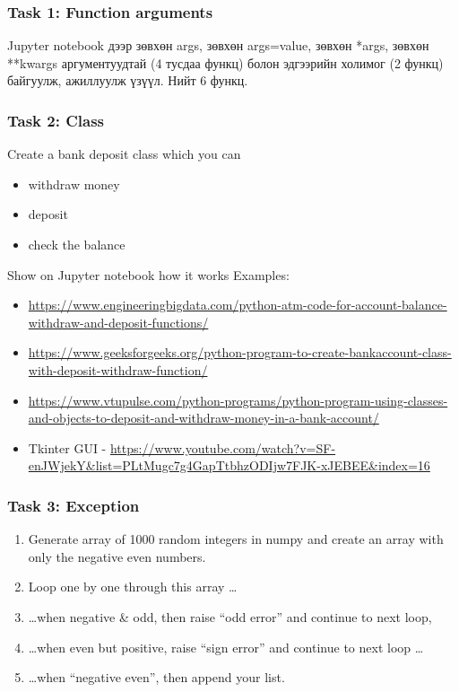\documentclass{beamer}
\begin{document}
\begin{frame}
    \frametitle{Task 1: Function arguments}
    Jupyter notebook дээр зөвхөн args, зөвхөн args=value, зөвхөн *args, 
    зөвхөн **kwargs аргументуудтай (4 тусдаа функц) болон эдгээрийн холимог 
    (2 функц) байгуулж, ажиллуулж үзүүл. Нийт 6 функц.
\end{frame}

\begin{frame}
    \frametitle{Task 2: Class}
    Create a bank deposit class which you can 
    \begin{itemize}
        \item withdraw money
        \item deposit 
        \item check the balance
    \end{itemize}
    Show on Jupyter notebook how it works
\vskip 2mm
Examples: 
\tiny
    \begin{itemize}
        \item \url{https://www.engineeringbigdata.com/python-atm-code-for-account-balance-withdraw-and-deposit-functions/}
        \item \url{https://www.geeksforgeeks.org/python-program-to-create-bankaccount-class-with-deposit-withdraw-function/}
        \item \url{https://www.vtupulse.com/python-programs/python-program-using-classes-and-objects-to-deposit-and-withdraw-money-in-a-bank-account/}
        \item Tkinter GUI - \url{https://www.youtube.com/watch?v=SF-enJWjekY&list=PLtMugc7g4GapTtbhzODIjw7FJK-xJEBEE&index=16}
    \end{itemize}
\end{frame}

\begin{frame}
    \frametitle{Task 3: Exception}
    \begin{enumerate}
        \item Generate array of 1000 random integers in numpy and create an array with only the negative even numbers.
        \item Loop one by one through this array …
        \item \ldots when negative & odd, then raise “odd error” and continue to next loop, 
        \item \ldots when even but positive, raise “sign error” and continue to next loop \ldots
        \item \ldots when “negative even”, then append your list. 
    \end{enumerate}
\end{frame}
\end{document}
